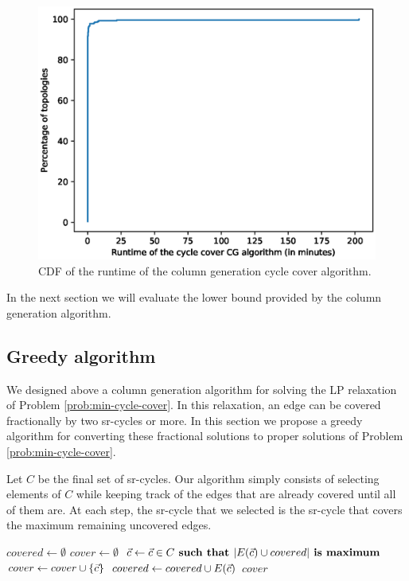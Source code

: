 \begin{figure}
\begin{center}
\includegraphics[width=.9\columnwidth]{./Network-lib/data/plot/minCycleCover_runtime_cdf.eps}
\end{center}
\caption{CDF of the runtime of the column generation cycle cover algorithm.}
\label{fig:cc_runtime}
\end{figure}

In the next section we will evaluate the lower bound provided by the column generation algorithm.


\subsection{Greedy algorithm}

We designed above a column generation algorithm for solving the LP relaxation of Problem \ref{prob:min-cycle-cover}. In this relaxation, an edge
can be covered fractionally by two sr-cycles or more. In this section we propose a greedy algorithm for converting these fractional solutions to proper 
solutions of Problem \ref{prob:min-cycle-cover}.

Let $C$ be the final set of sr-cycles. Our algorithm simply consists of selecting elements of $C$ 
while keeping track of the edges that are already covered until all of them are. At each step,
the sr-cycle that we selected is the sr-cycle that covers the maximum remaining uncovered edges. 

\begin{algorithm}[t]
\small
\caption{$\textsf{greedy-cc}\left( G, C \right)$}
\begin{algorithmic}[1]
\STATE $covered \gets \emptyset$
\STATE $cover \gets \emptyset$
  \STATE $\vec{c} \gets \vec{c} \in C \textbf{ such that } |E(\vec{c}) \cup covered| \textbf{ is maximum}$
  \STATE $cover \gets cover \cup \{ \vec{c} \}$
  \STATE $covered \gets covered \cup E(\vec{c})$
\ENDWHILE
\RETURN $cover$
\end{algorithmic}
\label{algo:greedy-cc}
\end{algorithm}

